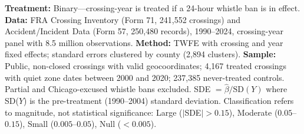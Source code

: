 \begin{table}[t]
\begin{minipage}{\textwidth}
\textbf{Treatment:} Binary---crossing-year is treated if a 24-hour whistle ban is in effect.
\textbf{Data:} FRA Crossing Inventory (Form 71, 241,552 crossings) and Accident/Incident Data (Form 57, 250,480 records), 1990--2024, crossing-year panel with 8.5 million observations.
\textbf{Method:} TWFE with crossing and year fixed effects; standard errors clustered by county (2,894 clusters).
\textbf{Sample:} Public, non-closed crossings with valid geocoordinates; 4,167 treated crossings with quiet zone dates between 2000 and 2020; 237,385 never-treated controls. Partial and Chicago-excused whistle bans excluded.
SDE $= \hat{\beta} / \text{SD}(Y)$ where SD($Y$) is the pre-treatment (1990--2004) standard deviation.
Classification refers to magnitude, not statistical significance: Large ($|$SDE$| > 0.15$), Moderate ($0.05$--$0.15$), Small ($0.005$--$0.05$), Null ($< 0.005$).
\end{minipage}
\end{table}

